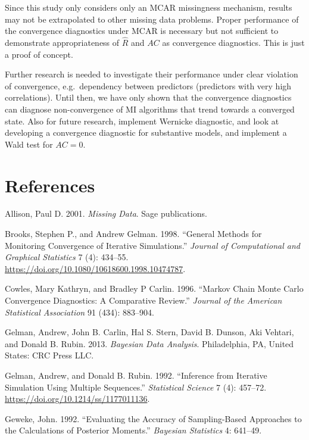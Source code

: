 \documentclass[
  Royal, times, sageapa]{sagej}
\begin{document}
Since this study only considers only an MCAR missingness mechanism,
results may not be extrapolated to other missing data problems. Proper
performance of the convergence diagnostics under MCAR is necessary but
not sufficient to demonstrate appropriateness of \(\widehat{R}\) and
\(AC\) as convergence diagnostics. This is just a proof of concept.

Further research is needed to investigate their performance under clear
violation of convergence, e.g.~dependency between predictors (predictors
with very high correlations). Until then, we have only shown that the
convergence diagnostics can diagnose non-convergence of MI algorithms
that trend towards a converged state. Also for future research,
implement Wernicke diagnostic, and look at developing a convergence
diagnostic for substantive models, and implement a Wald test for
\(AC = 0\).

\hypertarget{references}{%
\section*{References}\label{references}}

\hypertarget{refs}{}
\leavevmode\hypertarget{ref-alli02}{}%
Allison, Paul D. 2001. \emph{Missing Data}. Sage publications.

\leavevmode\hypertarget{ref-broo98}{}%
Brooks, Stephen P., and Andrew Gelman. 1998. ``General Methods for
Monitoring Convergence of Iterative Simulations.'' \emph{Journal of
Computational and Graphical Statistics} 7 (4): 434--55.
\url{https://doi.org/10.1080/10618600.1998.10474787}.

\leavevmode\hypertarget{ref-cowl96}{}%
Cowles, Mary Kathryn, and Bradley P Carlin. 1996. ``Markov Chain Monte
Carlo Convergence Diagnostics: A Comparative Review.'' \emph{Journal of
the American Statistical Association} 91 (434): 883--904.

\leavevmode\hypertarget{ref-gelm13}{}%
Gelman, Andrew, John B. Carlin, Hal S. Stern, David B. Dunson, Aki
Vehtari, and Donald B. Rubin. 2013. \emph{Bayesian Data Analysis}.
Philadelphia, PA, United States: CRC Press LLC.

\leavevmode\hypertarget{ref-gelm92}{}%
Gelman, Andrew, and Donald B. Rubin. 1992. ``Inference from Iterative
Simulation Using Multiple Sequences.'' \emph{Statistical Science} 7 (4):
457--72. \url{https://doi.org/10.1214/ss/1177011136}.

\leavevmode\hypertarget{ref-gewe92}{}%
Geweke, John. 1992. ``Evaluating the Accuracy of Sampling-Based
Approaches to the Calculations of Posterior Moments.'' \emph{Bayesian
Statistics} 4: 641--49.
\end{document}
